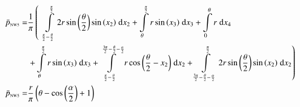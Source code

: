 \begin{align}
    \bar{p}_{\text{\tiny{NW5}}} =&\frac{1}{\pi} \left(\;\;\int\limits_{\frac{\pi}{2} - \frac{\theta}{2}}^{\frac{\pi}{2}}2 r \sin{\left (\frac{\theta}{2} \right )} \sin{\left (x_{2} \right )}\;\mathrm{d}x_{2}+\int\limits_{\theta}^{\frac{\pi}{2}}r \sin{\left (x_{3} \right )}\;\mathrm{d}x_{3}+\int\limits_{0}^{\theta}r\;\mathrm{d}x_{4}\right.\notag\\
 &\left.+\int\limits_{\theta}^{\frac{\pi}{2}}r \sin{\left (x_{3} \right )}\;\mathrm{d}x_{3}+\int\limits_{\frac{\pi}{2} - \frac{\theta}{2}}^{\frac{3 \pi}{2} - \frac{\theta}{2} - \frac{\alpha}{2}}r \cos{\left (\frac{\theta}{2} - x_{2} \right )}\;\mathrm{d}x_{2}+\int\limits_{\frac{3 \pi}{2} - \frac{\theta}{2} - \frac{\alpha}{2}}^{\frac{\pi}{2}}2 r \sin{\left (\frac{\theta}{2} \right )} \sin{\left (x_{2} \right )}\;\mathrm{d}x_{2}\right)\label{pNW5Def}\\
    \bar{p}_{\text{\tiny{NW5}}}  =& \frac{r}{\pi} \left(\theta - \cos{\left (\frac{\alpha}{2} \right )} + 1\right)\label{pNW5Sln}
\end{align}